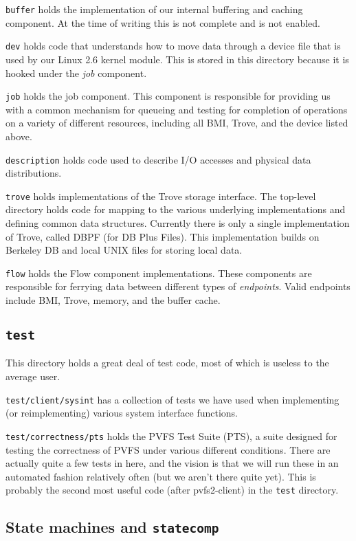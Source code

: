 \texttt{buffer} holds the implementation of our internal buffering and caching
component.  At the time of writing this is not complete and is not enabled.

\texttt{dev} holds code that understands how to move data through a device
file that is used by our Linux 2.6 kernel module.  This is stored in this
directory because it is hooked under the \emph{job} component.

\texttt{job} holds the job component.  This component is responsible for
providing us with a common mechanism for queueing and testing for completion
of operations on a variety of different resources, including all BMI, Trove,
and the device listed above.

\texttt{description} holds code used to describe I/O accesses and physical
data distributions.

\texttt{trove} holds implementations of the Trove storage interface.  The
top-level directory holds code for mapping to the various underlying
implementations and defining common data structures.  Currently there is only
a single implementation of Trove, called DBPF (for DB Plus Files).  This
implementation builds on Berkeley DB and local UNIX files for storing local
data.

\texttt{flow} holds the Flow component implementations.  These components are
responsible for ferrying data between different types of \emph{endpoints}.
Valid endpoints include BMI, Trove, memory, and the buffer cache.

\subsection{\texttt{test}}

This directory holds a great deal of test code, most of which is useless to
the average user.

\texttt{test/client/sysint} has a collection of tests we have used when
implementing (or reimplementing) various system interface functions.

\texttt{test/correctness/pts} holds the PVFS Test Suite (PTS), a suite
designed for testing the correctness of PVFS under various different
conditions.  There are actually quite a few tests in here, and the vision is
that we will run these in an automated fashion relatively often (but we aren't
there quite yet).  This is probably the second most useful code (after
pvfs2-client) in the \texttt{test} directory.

\subsection{State machines and \texttt{statecomp}}

